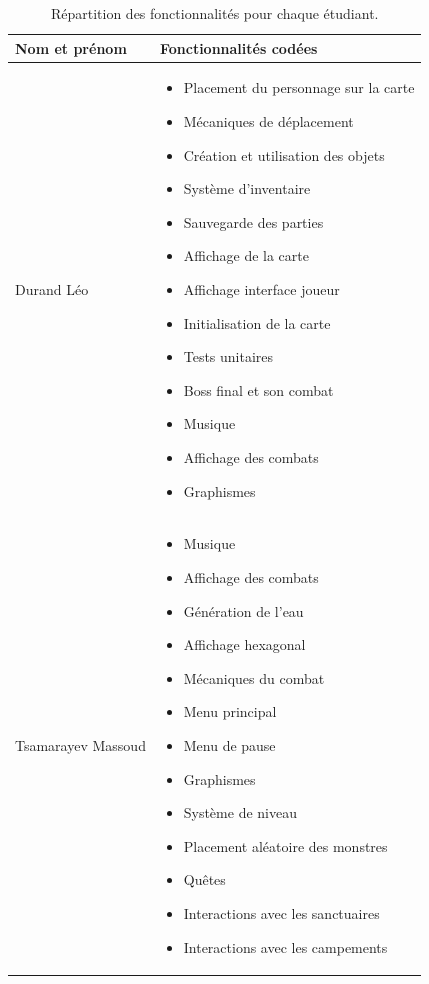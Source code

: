 \documentclass[11pt,a4paper]{article}
\begin{document}
\begin{xltabular}{\textwidth}{|l|X|}
\caption{Répartition des fonctionnalités pour chaque étudiant.} \label{tab_taches} \\
\hline
\textbf{Nom et prénom} & \textbf{Fonctionnalités codées} \\
\hline
\endhead %

\hline
\endfoot %

Durand Léo & 
\begin{itemize}[leftmargin=*, noitemsep]
\item Placement du personnage sur la carte
\item Mécaniques de déplacement
\item Création et utilisation des objets
\item Système d'inventaire
\item Sauvegarde des parties
\item Affichage de la carte
\item Affichage interface joueur
\item Initialisation de la carte
\item Tests unitaires
\item Boss final et son combat
\item Musique
\item Affichage des combats
\item Graphismes
\end{itemize} \\
\hline
Tsamarayev Massoud & 
\begin{itemize}[leftmargin=*, noitemsep]
\item Musique
\item Affichage des combats
\item Génération de l'eau
\item Affichage hexagonal
\item Mécaniques du combat
\item Menu principal
\item Menu de pause
\item Graphismes
\item Système de niveau
\item Placement aléatoire des monstres
\item Quêtes
\item Interactions avec les sanctuaires
\item Interactions avec les campements
\end{itemize} \\

\end{xltabular}
\end{document}

